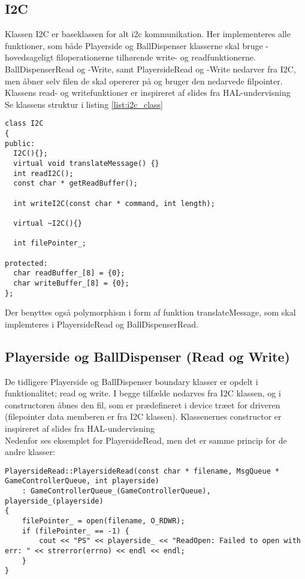 \documentclass[Softwaredesign/Softwaredesign_main.tex]{subfiles}
\begin{document}
\subsection{I2C}
Klassen I2C er baseklassen for alt i2c kommunikation. Her implementeres alle funktioner, som både Playerside og BallDispenser klasserne skal bruge - hovedsageligt filoperationerne tilhørende write- og readfunktionerne. BallDispenserRead og -Write, samt PlayersideRead og -Write nedarver fra I2C, men åbner selv filen de skal opererer på og bruger den nedarvede filpointer. Klassens read- og writefunktioner er inspireret af slides fra HAL-undervisning \autocite{HAL2018}\\
Se klassens struktur i listing \ref{list:i2c_class}
\begin{lstlisting}[caption={I2C headerfil}, label=list:i2c_class]
class I2C
{
public:
  I2C(){};
  virtual void translateMessage() {}
  int readI2C();
  const char * getReadBuffer();

  int writeI2C(const char * command, int length);

  virtual ~I2C(){}

  int filePointer_;

protected:
  char readBuffer_[8] = {0};
  char writeBuffer_[8] = {0};
};
\end{lstlisting}
Der benyttes også polymorphism i form af funktion translateMessage, som skal implemteres i PlayersideRead og BallDispenserRead. 

\subsection{Playerside og BallDispenser (Read og Write)}
De tidligere Playerside og BallDispenser boundary klasser er opdelt i funktionalitet; read og write. I begge tilfælde nedarves fra I2C klassen, og i constructoren åbnes den fil, som er prædefineret i device træet for driveren (filepointer data memberen er fra I2C klassen). Klassenernes constructor er inspireret af slides fra HAL-undervisning \autocite{HAL2018}\\
Nedenfor ses eksemplet for PlayersideRead, men det er samme princip for de andre klasser: 
\begin{lstlisting}[caption={PlayersideRead constructor}, label=list:construct]
PlayersideRead::PlayersideRead(const char * filename, MsgQueue * GameControllerQueue, int playerside)
	: GameControllerQueue_(GameControllerQueue), playerside_(playerside)
{
	filePointer_ = open(filename, O_RDWR);
	if (filePointer_ == -1) {
		cout << "PS" << playerside_ << "ReadOpen: Failed to open with err: " << strerror(errno) << endl << endl;
	}
}
\end{lstlisting}
\end{document}
